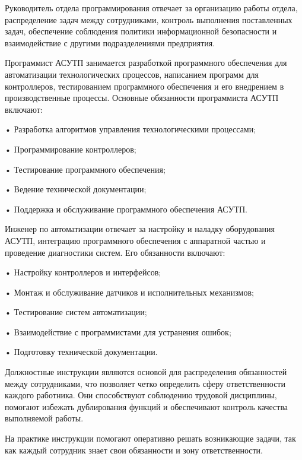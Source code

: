 {  \par \redline Руководитель отдела программирования отвечает за организацию работы отдела, распределение задач между сотрудниками, контроль выполнения поставленных задач, обеспечение соблюдения политики информационной безопасности и взаимодействие с другими подразделениями предприятия.

  \par \redline Программист АСУТП занимается разработкой программного обеспечения для автоматизации технологических процессов, написанием программ для контроллеров, тестированием программного обеспечения и его внедрением в производственные процессы. Основные обязанности программиста АСУТП включают:
  \par \redline • Разработка алгоритмов управления технологическими процессами;
  \par \redline • Программирование контроллеров;
  \par \redline • Тестирование программного обеспечения;
  \par \redline • Ведение технической документации;
  \par \redline • Поддержка и обслуживание программного обеспечения АСУТП.

  \par \redline Инженер по автоматизации отвечает за настройку и наладку оборудования АСУТП, интеграцию программного обеспечения с аппаратной частью и проведение диагностики систем. Его обязанности включают:
  \par \redline • Настройку контроллеров и интерфейсов;
  \par \redline • Монтаж и обслуживание датчиков и исполнительных механизмов;
  \par \redline • Тестирование систем автоматизации;
  \par \redline • Взаимодействие с программистами для устранения ошибок;
  \par \redline • Подготовку технической документации.

  \par \redline Должностные инструкции являются основой для распределения обязанностей между сотрудниками, что позволяет четко определить сферу ответственности каждого работника. Они способствуют соблюдению трудовой дисциплины, помогают избежать дублирования функций и обеспечивают контроль качества выполняемой работы.

  \par \redline На практике инструкции помогают оперативно решать возникающие задачи, так как каждый сотрудник знает свои обязанности и зону ответственности. 

  \par 
}



